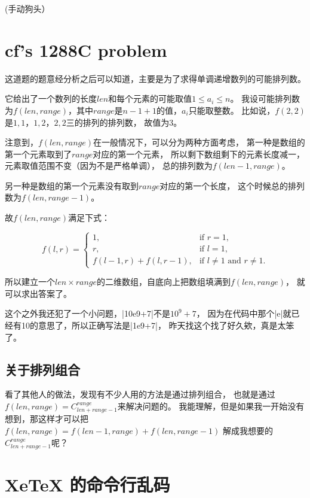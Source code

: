 (手动狗头）


\section{cf's 1288C problem}

这道题的题意经分析之后可以知道，主要是为了求得单调递增数列的可能排列数。

它给出了一个数列的长度$len$和每个元素的可能取值$1\le a_i\le n$。
我设可能排列数为$f(len, range)$，其中$range$是$n-1+1$的值，$a_i$只能取整数。
比如说，$f(2, 2)$是${1, 1}$，${1, 2}$，${2, 2}$三的排列的排列数，
故值为3。

注意到，$f(len, range)$在一般情况下，可以分为两种方面考虑，
第一种是数组的第一个元素取到了$range$对应的第一个元素，
所以剩下数组剩下的元素长度减一，元素取值范围不变（因为不是严格单调），
总的排列数为$f(len-1, range)$。

另一种是数组的第一个元素没有取到$range$对应的第一个长度，
这个时候总的排列数为$f(len, range-1)$。

故$f(len, range)$满足下式：

\[f(l, r)=
\begin{cases}
    1, & \text{if } r=1, \\
    r, & \text{if } l=1,\\
    f(l-1, r) + f(l, r-1), & \text{if } l\ne 1 \text{ and } r\ne1.
\end{cases}\]

所以建立一个$len\times range$的二维数组，自底向上把数组填满到$f(len, range)$，
就可以求出答案了。

这个之外我还犯了一个小问题，\vb|10e9+7|不是$10^9+7$，
因为在代码中那个\vb|e|就已经有10的意思了，所以正确写法是\vb|1e9+7|，
昨天找这个找了好久欸，真是太笨了。

\subsection{关于排列组合}

看了其他人的做法，发现有不少人用的方法是通过排列组合，
也就是通过$f(len, range)=C_{len+range-1}^{range}$来解决问题的。
我能理解，但是如果我一开始没有想到，那这样才可以把
$f(len, range)=f(len-1, range) + f(len, range-1)$
解成我想要的$C_{len+range-1}^{range}$呢？


\section{XeTeX 的命令行乱码}

